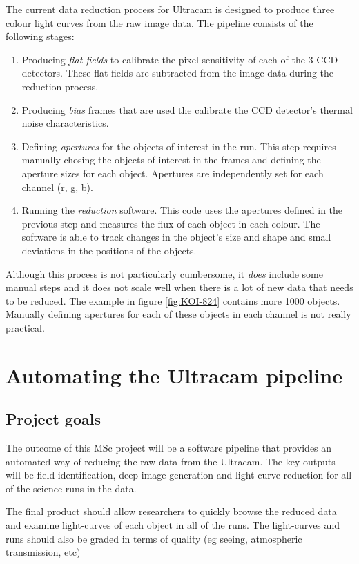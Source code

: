 \documentclass[a4paper,10pt]{article}
\begin{document}
The current data reduction process for Ultracam is designed to produce three colour light curves from the raw image data. The pipeline consists of the following stages:
\begin{enumerate}
	\item Producing \emph{flat-fields} to calibrate the pixel sensitivity of each of the 3 CCD detectors. These flat-fields are subtracted from the image data during the reduction process.
	\item Producing \emph{bias} frames that are used the calibrate the CCD detector's thermal noise characteristics. 
	\item Defining \emph{apertures} for the objects of interest in the run. This step requires manually chosing the objects of interest in the frames and defining the aperture sizes for each object. Apertures are independently set for each channel (r, g, b). 
	\item Running the \emph{reduction} software. This code uses the apertures defined in the previous step and measures the flux of each object in each colour. The software is able to track changes in the object's size and shape and small deviations in the positions of the objects. 
\end{enumerate} 
Although this process is not particularly cumbersome, it \emph{does} include some manual steps and it does not scale well when there is a lot of new data that needs to be reduced. The example in figure \ref{fig:KOI-824} contains more 1000 objects. Manually defining apertures for each of these objects in each channel is not really practical. 

\section{Automating the Ultracam pipeline}

\subsection{Project goals}
The outcome of this MSc project will be a software pipeline that provides an automated way of reducing the raw data from the Ultracam.  The key outputs will be field identification, deep image generation and light-curve reduction for all of the science runs in the data. 

The final product should allow researchers to quickly browse the reduced data and examine light-curves of each object in all of the 
runs. The light-curves and runs should also be graded in terms of quality (eg seeing, atmospheric transmission, etc) 
\end{document}
